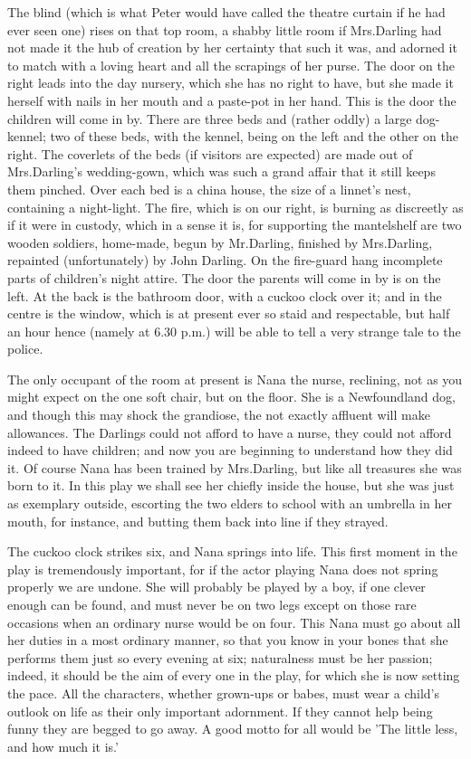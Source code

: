 \begin{stagedir}
The blind
(which is what Peter would have called the theatre curtain if he had ever seen one)
rises on that top room,
a shabby little room if Mrs.\@ Darling had not made it the hub of creation by her certainty that such it was,
and adorned it to match with a loving heart and all the scrapings of her purse.
The door on the right leads into the day nursery,
which she has no right to have, but she made it herself with nails in her mouth and a paste-pot in her hand.
This is the door the children will come in by.
There are three beds and (rather oddly) a large dog-kennel;
two of these beds, with the kennel, being on the left and the other on the right.
The coverlets of the beds (if visitors are expected) are made out of Mrs.\@ Darling's wedding-gown,
which was such a grand affair that it still keeps them pinched.
Over each bed is a china house, the size of a linnet's nest, containing a night-light.
The fire, which is on our right, is burning as discreetly as if it were in custody,
which in a sense it is, for supporting the mantelshelf are two wooden soldiers, home-made,
begun by Mr.\@ Darling, finished by Mrs.\@ Darling, repainted (unfortunately) by John Darling.
On the fire-guard hang incomplete parts of children's night attire.
The door the parents will come in by is on the left.
At the back is the bathroom door, with a cuckoo clock over it;
and in the centre is the window, which is at present ever so staid and respectable,
but half an hour hence (namely at 6.30 p.m.\@) will be able to tell a very strange tale to the police.

The only occupant of the room at present is Nana the nurse,
reclining, not as you might expect on the one soft chair, but on the floor.
She is a Newfoundland dog, and though this may shock the grandiose,
the not exactly affluent will make allowances.
The Darlings could not afford to have a nurse,
they could not afford indeed to have children;
and now you are beginning to understand how they did it.
Of course Nana has been trained by Mrs.\@ Darling,
but like all treasures she was born to it.
In this play we shall see her chiefly inside the house,
but she was just as exemplary outside,
escorting the two elders to school with an umbrella in her mouth, for instance,
and butting them back into line if they strayed.

The cuckoo clock strikes six, and Nana springs into life.
This first moment in the play is tremendously important,
for if the actor playing Nana does not spring properly we are undone.
She will probably be played by a boy, if one clever enough can be found,
and must never be on two legs except on those rare occasions when an ordinary nurse would be on four.
This Nana must go about all her duties in a most ordinary manner,
so that you know in your bones that she performs them just so every evening at six;
naturalness must be her passion;
indeed, it should be the aim of every one in the play, for which she is now setting the pace.
All the characters, whether grown-ups or babes,
must wear a child's outlook on life as their only important adornment.
If they cannot help being funny they are begged to go away.
A good motto for all would be 'The little less, and how much it is.'


\end{stagedir}
